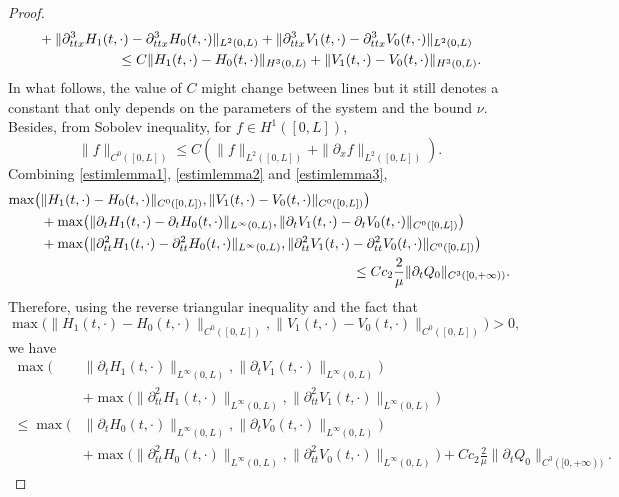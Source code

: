 \begin{proof}
\begin{align}
&+\|\partial_{ttx}^{3}H_{1}(t,\cdot)-\partial_{ttx}^{3}H_{0}(t,\cdot)\|_{L^{2}(0,L)}+\|\partial_{ttx}^{3}V_{1}(t,\cdot)-\partial_{ttx}^{3}V_{0}(t,\cdot)\|_{L^{2}(0,L)}
\\\notag
&\hspace*{2cm}\leq C\|H_{1}(t,\cdot)-H_{0}(t,\cdot)\|_{H^{3}(0,L)}+\|V_{1}(t,\cdot)-V_{0}(t,\cdot)\|_{H^{3}(0,L)}.
\end{align}
In what follows, the value of $C$ might change between lines but it still denotes a constant that only depends on the parameters of the system and the bound $\nu$. Besides, from Sobolev inequality, for $f\in H^{1}([0,L])$,
\begin{equation}\label{estimlemma3}
\|f\|_{C^{0}([0,L])} \leq C\left(\|f\|_{L^{2}([0,L])}+\|\partial_{x}f\|_{L^{2}([0,L])}\right).
\end{equation}
Combining \eqref{estimlemma1}, \eqref{estimlemma2} and \eqref{estimlemma3},
\begin{align*}
\max\bigl(&\|H_{1}(t,\cdot)-H_{0}(t,\cdot)\|_{C^{0}([0,L])},\|V_{1}(t,\cdot)-V_{0}(t,\cdot)\|_{C^{0}([0,L])}\bigr)\\
&+\max\bigl(\|\partial_{t}H_{1}(t,\cdot)-\partial_{t}H_{0}(t,\cdot)\|_{L^{\infty}(0,L)},\|\partial_{t}V_{1}(t,\cdot)-\partial_{t}V_{0}(t,\cdot)\|_{C^{0}([0,L])}\bigr)\\
&+
\max\bigl(\|\partial_{tt}^{2}H_{1}(t,\cdot)-\partial_{tt}^{2}H_{0}(t,\cdot)\|_{L^{\infty}(0,L)},\|\partial_{tt}^{{2}}V_{1}(t,\cdot)-\partial_{tt}^{{2}}V_{0}(t,\cdot)\|_{C^{0}([0,L])}\bigr)\\
&\hspace*{8cm}\leq Cc_{2} \frac{2}{\mu} \|\partial_{t}Q_{0}\|_{C^{3}([0,+\infty))}.
\end{align*}
Therefore, using the {reverse} triangular inequality and the fact that
\[
\max \bigl(\|H_{1}(t,\cdot)-H_{0}(t,\cdot)\|_{C^{0}([0,L])},\|V_{1}(t,\cdot)-V_{0}(t,\cdot)\|_{C^{0}([0,L])} \bigr)>0,
\]
we have
\begin{equation*}
\begin{split}
\max\bigl(&\|\partial_{t}H_{1}(t,\cdot)\|_{L^{\infty}(0,L)},\|\partial_{t}V_{1}(t,\cdot)\|_{L^{\infty}(0,L)}\bigr)\\&+
\max\bigl(\|\partial_{tt}^{2}H_{1}(t,\cdot)\|_{L^{\infty}(0,L)},\|\partial_{tt}^{{2}}V_{1}(t,\cdot)\|_{L^{\infty}(0,L)}\bigr)\\
\leq \max\bigl(&\|\partial_{t}H_{0}(t,\cdot)\|_{L^{\infty}(0,L)},\|\partial_{t}V_{0}(t,\cdot)\|_{L^{\infty}(0,L)}\bigr)\\
&+
\max\bigl(\|\partial_{tt}^{2}H_{0}(t,\cdot)\|_{L^{\infty}(0,L)},\|\partial_{tt}^{{2}}V_{0}(t,\cdot)\|_{L^{\infty}(0,L)}\bigr)+ Cc_{2} \frac{2}{\mu} \|\partial_{t}Q_{0}\|_{C^{3}([0,+\infty))}.

\end{split}
\end{equation*}
\end{proof}
